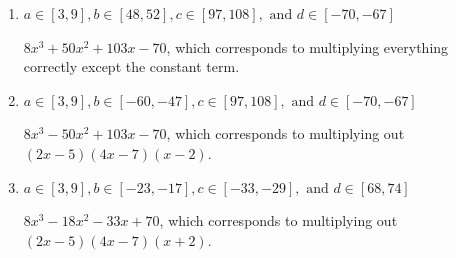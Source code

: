 \documentclass{extbook}[14pt]
\begin{document}
\begin{enumerate}
{\begin{enumerate}[label=\Alph*.]
* $8x^{3} +50 x^{2} +103 x + 70$, which is the correct option.
\item \( a \in [3, 9], b \in [48, 52], c \in [97, 108], \text{ and } d \in [-70, -67] \)

$8x^{3} +50 x^{2} +103 x -70$, which corresponds to multiplying everything correctly except the constant term.
\item \( a \in [3, 9], b \in [-60, -47], c \in [97, 108], \text{ and } d \in [-70, -67] \)

$8x^{3} -50 x^{2} +103 x -70$, which corresponds to multiplying out $(2x -5)(4x -7)(x -2)$.
\item \( a \in [3, 9], b \in [-23, -17], c \in [-33, -29], \text{ and } d \in [68, 74] \)

$8x^{3} -18 x^{2} -33 x + 70$, which corresponds to multiplying out $(2x -5)(4x -7)(x + 2)$.
\end{enumerate}

}
\end{enumerate}
\end{document}
